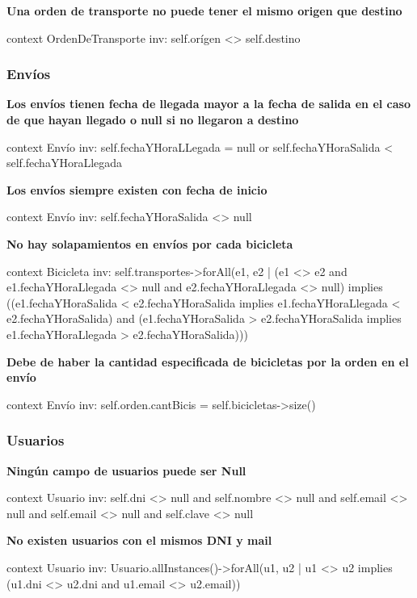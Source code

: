 \documentclass[a4paper, 10pt, twoside]{article}
\newenvironment{ocl}[1]
  {
    \textbf{#1}
    \verbatim
  }{
    \endverbatim
  }
\begin{document}
\begin{ocl}{Una orden de transporte no puede tener el mismo origen que destino}
  context OrdenDeTransporte
  inv: self.orígen <> self.destino
\end{ocl}


\subsubsection{Envíos}

\begin{ocl}{Los envíos tienen fecha de llegada mayor a la fecha de salida en el caso de que hayan llegado o null si no llegaron a destino}
  context Envío
  inv: self.fechaYHoraLLegada = null or self.fechaYHoraSalida < self.fechaYHoraLlegada
\end{ocl}

\begin{ocl}{Los envíos siempre existen con fecha de inicio}
  context Envío
  inv: self.fechaYHoraSalida <> null
\end{ocl}

\begin{ocl}{No hay solapamientos en envíos por cada bicicleta}
  context Bicicleta
  inv: self.transportes->forAll(e1, e2 |
           (e1 <> e2 and e1.fechaYHoraLlegada <> null and e2.fechaYHoraLlegada <> null) implies
               ((e1.fechaYHoraSalida  < e2.fechaYHoraSalida implies
                 e1.fechaYHoraLlegada < e2.fechaYHoraSalida) and
                (e1.fechaYHoraSalida  > e2.fechaYHoraSalida implies
                 e1.fechaYHoraLlegada > e2.fechaYHoraSalida)))
\end{ocl}

\begin{ocl}{Debe de haber la cantidad especificada de bicicletas por la orden en el envío}
  context Envío
  inv: self.orden.cantBicis = self.bicicletas->size()
\end{ocl}


\subsubsection{Usuarios}

\begin{ocl}{Ningún campo de usuarios puede ser Null}
  context Usuario
  inv: self.dni <> null and
       self.nombre <> null and
       self.email <> null and
       self.email <> null and
       self.clave <> null
\end{ocl}

\begin{ocl}{No existen usuarios con el mismos DNI y mail}
  context Usuario
  inv: Usuario.allInstances()->forAll(u1, u2 |
           u1 <> u2 implies (u1.dni <> u2.dni and u1.email <> u2.email))
\end{ocl}
\end{document}
